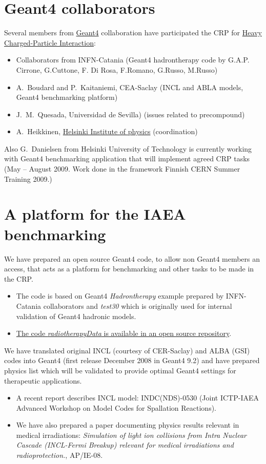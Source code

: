 \documentclass[twoside,floatfix,a4wide]{d}
\numberwithin{equation}{section} %
\begin{document}
\section{Geant4 collaborators}
\vspace{-0.4cm}
Several members from \href{http://geant4.cern.ch}{Geant4} collaboration
have participated the CRP for
\href{http://www-nds.iaea.org/charpar/charpar.htmlx}{Heavy Charged-Particle Interaction}:
\begin{itemize}
\item Collaborators from INFN-Catania 
(Geant4 hadrontherapy code by G.A.P. Cirrone, G.Cuttone, F. Di Rosa, F.Romano, G.Russo, M.Russo)
\item A.~Boudard and P.~Kaitaniemi, CEA-Saclay (INCL and ABLA models, Geant4 benchmarking platform) 
\item J.~M.~Quesada, Universidad de Sevilla) (issues related to precompound)
\item A.~Heikkinen, \href{http://www.hip.fi}{Helsinki Institute of physics} (coordination)
\end{itemize}

Also G.~Danielsen from Helsinki University of Technology is currently working with 
Geant4 benchmarking application that will implement agreed CRP tasks
(May -- August 2009. Work done in the framework Finnish CERN Summer Training 2009.)


\section{A platform for the IAEA benchmarking}
\vspace{-0.4cm}
We have prepared an open source Geant4 code, to allow non Geant4 members an access,
that acts as a  platform for benchmarking and other tasks to be made in the CRP.
\begin{itemize}
\item The code is based on Geant4 {\em Hadrontherapy} example prepared by INFN-Catania collaborators
and {\em test30} which is originally used for internal validation of Geant4 hadronic models.

\item \href{http://github.com/kaitanie/hadrontherapy/}{The code 
{\em radiotherapyData} is available in an open source repository}.
\end{itemize}

We have translated original INCL (courtesy of CER-Saclay) and ALBA (GSI) codes into
Geant4 (first release December 2008 in Geant4 9.2) and 
have prepared physics list which will be validated to provide optimal Geant4 settings 
for therapeutic applications. 
\begin{itemize}
\item  A recent report describes INCL model: INDC(NDS)-0530 
(Joint ICTP-IAEA Advanced Workshop on Model Codes for Spallation Reactions).
\item We have also prepared a paper 
documenting physics results relevant in medical irradiations: 
{\em Simulation of light ion collisions from Intra Nuclear Cascade
(INCL-Fermi Breakup) relevant for medical irradiations and
radioprotection.}, AP/IE-08.
\end{itemize}
\end{document}
